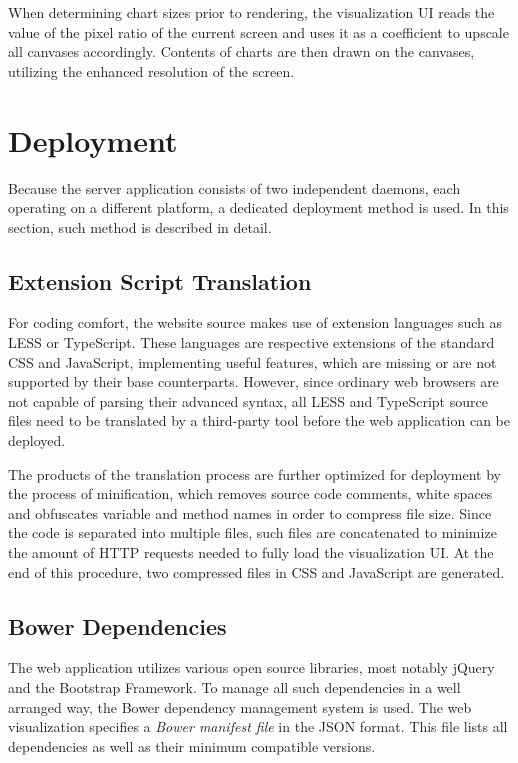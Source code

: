 When determining chart sizes prior to rendering, the visualization UI reads the value of the pixel ratio of the current screen and uses it as a coefficient to upscale all canvases accordingly. Contents of charts are then drawn on the canvases, utilizing the enhanced resolution of the screen.

\section{Deployment}
Because the server application consists of two independent daemons, each operating on a different platform, a dedicated deployment method is used. In this section, such method is described in detail.

\subsection{Extension Script Translation}
For coding comfort, the website source makes use of extension languages such as LESS or TypeScript. These languages are respective extensions of the standard CSS and JavaScript, implementing useful features, which are missing or are not supported by their base counterparts. However, since ordinary web browsers are not capable of parsing their advanced syntax, all LESS and TypeScript source files need to be translated by a third-party tool before the web application can be deployed.

The products of the translation process are further optimized for deployment by the process of minification, which removes source code comments, white spaces and obfuscates variable and method names in order to compress file size. Since the code is separated into multiple files, such files are concatenated to minimize the amount of HTTP requests needed to fully load the visualization UI. At the end of this procedure, two compressed files in CSS and JavaScript are generated.

\subsection{Bower Dependencies}
The web application utilizes various open source libraries, most notably jQuery and the Bootstrap Framework. To manage all such dependencies in a well arranged way, the Bower dependency management system is used. The web visualization specifies a \textit{Bower manifest file} in the JSON format. This file lists all dependencies as well as their minimum compatible versions.

